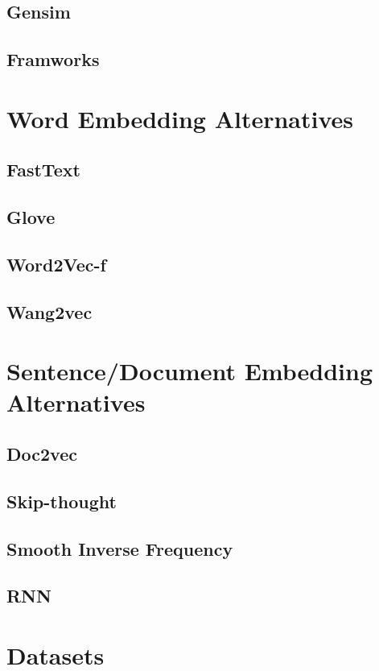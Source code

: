 \subsection{Gensim}
\subsection{Framworks}


\section{Word Embedding Alternatives}
\subsection{FastText}
\subsection{Glove}
\subsection{Word2Vec-f}
\subsection{Wang2vec}


\section{Sentence/Document Embedding Alternatives}
\subsection{Doc2vec}
\subsection{Skip-thought}
\subsection{Smooth Inverse Frequency}
\subsection{RNN}


\section{Datasets}


